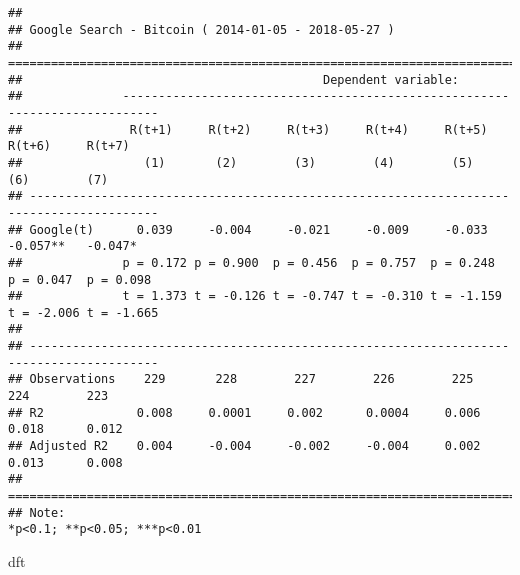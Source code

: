 \documentclass[
]{article}
\newenvironment{Shaded}{\begin{snugshade}}{\end{snugshade}}
\newcommand{\NormalTok}[1]{#1}
\begin{document}
\begin{verbatim}
## 
## Google Search - Bitcoin ( 2014-01-05 - 2018-05-27 )
## ========================================================================================
##                                          Dependent variable:                            
##              ---------------------------------------------------------------------------
##               R(t+1)     R(t+2)     R(t+3)     R(t+4)     R(t+5)     R(t+6)     R(t+7)  
##                 (1)       (2)        (3)        (4)        (5)        (6)        (7)    
## ----------------------------------------------------------------------------------------
## Google(t)      0.039     -0.004     -0.021     -0.009     -0.033    -0.057**   -0.047*  
##              p = 0.172 p = 0.900  p = 0.456  p = 0.757  p = 0.248  p = 0.047  p = 0.098 
##              t = 1.373 t = -0.126 t = -0.747 t = -0.310 t = -1.159 t = -2.006 t = -1.665
##                                                                                         
## ----------------------------------------------------------------------------------------
## Observations    229       228        227        226        225        224        223    
## R2             0.008     0.0001     0.002      0.0004     0.006      0.018      0.012   
## Adjusted R2    0.004     -0.004     -0.002     -0.004     0.002      0.013      0.008   
## ========================================================================================
## Note:                                                        *p<0.1; **p<0.05; ***p<0.01
\end{verbatim}

\begin{Shaded}
\begin{Highlighting}[]
\NormalTok{dft}
\end{Highlighting}
\end{Shaded}
\end{document}
